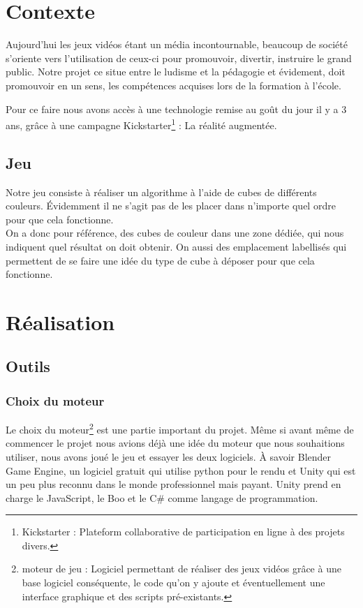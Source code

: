 \documentclass[a4paper,11pt]{myreport}
\begin{document}
\chapter{Contexte}
\par Aujourd'hui les jeux vidéos étant un média incontournable, beaucoup de société s'oriente vers l'utilisation de ceux-ci pour promouvoir, divertir, instruire le grand public. Notre projet ce situe entre le ludisme et la pédagogie et évidement, doit promouvoir en un sens, les compétences acquises lors de la formation à l'école.
\par Pour ce faire nous avons accès à une technologie remise au goût du jour il y a 3 ans, grâce à une campagne Kickstarter\footnote{Kickstarter : Plateform collaborative de participation en ligne à des projets divers.} : La réalité augmentée.

\section{Jeu}
\par Notre jeu consiste à réaliser un algorithme à l'aide de cubes de différents couleurs. Évidemment il ne s'agit pas de les placer dans n'importe quel ordre pour que cela fonctionne.\\
On a donc pour référence, des cubes de couleur dans une zone dédiée, qui nous indiquent quel résultat on doit obtenir. On aussi des emplacement labellisés qui permettent de se faire une idée du type de cube à déposer pour que cela fonctionne. 


\chapter{Réalisation}
\section{Outils}
\subsection{Choix du moteur}
\par Le choix du moteur\footnote{moteur de jeu : Logiciel permettant de réaliser des jeux vidéos grâce à une base logiciel conséquente, le code qu'on y ajoute et éventuellement une interface graphique et des scripts pré-existants.} est une partie important du projet. Même si avant même de commencer le projet nous avions déjà une idée du moteur que nous souhaitions utiliser, nous avons joué le jeu et essayer les deux logiciels. \`A savoir Blender Game Engine, un logiciel gratuit qui utilise python pour le rendu et Unity qui est un peu plus reconnu dans le monde professionnel mais payant. Unity prend en charge le JavaScript, le Boo et le C\# comme langage de programmation.
\end{document}
